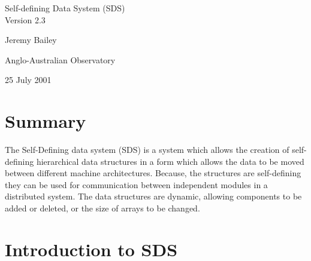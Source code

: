 \def\mansemiverbatim{\@mansemiverbatim\frenchspacing\@vobeyspaces}

\let\endmansemiverbatim=\endtrivlist


\makeatother

 
\setlength{\textwidth}{160mm}
\setlength{\textheight}{225mm}
\setlength{\topmargin}{-5mm}
\setlength{\oddsidemargin}{0mm}
\setlength{\evensidemargin}{0mm}
\setlength{\parindent}{0mm}
\setlength{\parskip}{\medskipamount}
\newenvironment{cozy}[1]%
{\begin{list}{}{%
\settowidth{\labelwidth}{\large\tt #1}%
\setlength{\labelsep}{5mm}%
\setlength{\leftmargin}{\labelwidth}\addtolength{\leftmargin}{\labelsep}%
\setlength{\parsep}{\medskipamount}%
}}{\end{list}}



\begin{center}
{\LARGE  Self-defining Data System (SDS) \\ Version 2.3 }

\vspace{2cm}
{\large Jeremy Bailey}

\vspace{1cm}
{\large Anglo-Australian Observatory}

\vspace{1cm}
{\large 25 July 2001}

\end{center}

\tableofcontents

\newpage
\section{Summary}

The Self-Defining data system (SDS) is a system which allows the creation of
self-defining hierarchical data structures in a form which allows the data to
be moved between different machine architectures. Because, the structures are
self-defining they can be used for communication between independent modules
in a distributed system. The data structures are dynamic, allowing components
to be added or deleted, or the size of arrays to be changed.

\section{Introduction to SDS}

